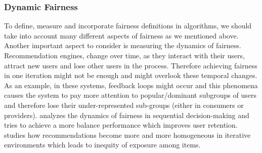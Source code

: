 

\subsubsection{Dynamic Fairness}  
To define, measure and incorporate fairness definitions in algorithms, we should take into account many different aspects of fairness as we mentioned above. Another important aspect to consider is measuring the dynamics of fairness. Recommendation engines, change over time, as they interact with their users, attract new users and lose other users in the process. Therefore achieving fairness in one iteration might not be enough and might overlook these temporal changes.
As an example, in these systems, feedback loops might occur and this phenomena causes the system to pay more attention to popular/dominant subgroups of users \cite{hashimoto2018fairness} and therefore lose their under-represented sub-groups (either in consumers or providers). \cite{zhang2019group} analyzes the dynamics of fairness in sequential decision-making and tries to achieve a more balance performance which improves user retention. \cite{Chaney2018} studies how recommendations become more and more homogeneous in iterative environments which leads to inequity of exposure among items. 
    
